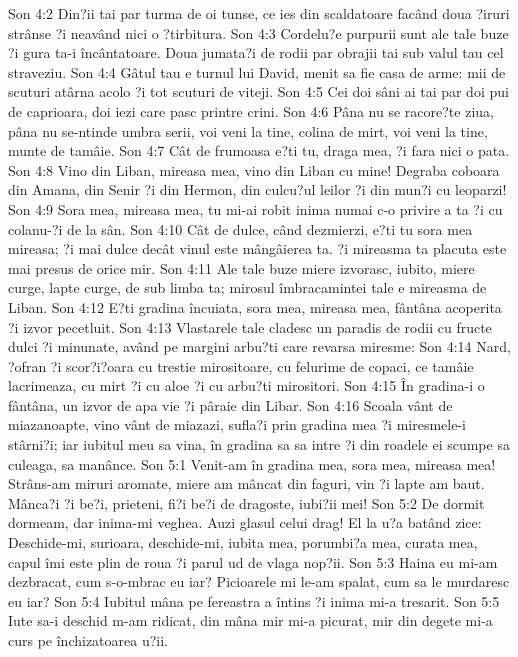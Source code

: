 Son 4:2  Din?ii tai par turma de oi tunse, ce ies din scaldatoare facând doua ?iruri strânse ?i neavând nici o ?tirbitura.
Son 4:3  Cordelu?e purpurii sunt ale tale buze ?i gura ta-i încântatoare. Doua jumata?i de rodii par obrajii tai sub valul tau cel straveziu.
Son 4:4  Gâtul tau e turnul lui David, menit sa fie casa de arme: mii de scuturi atârna acolo ?i tot scuturi de viteji.
Son 4:5  Cei doi sâni ai tai par doi pui de caprioara, doi iezi care pasc printre crini.
Son 4:6  Pâna nu se racore?te ziua, pâna nu se-ntinde umbra serii, voi veni la tine, colina de mirt, voi veni la tine, munte de tamâie.
Son 4:7  Cât de frumoasa e?ti tu, draga mea, ?i fara nici o pata.
Son 4:8  Vino din Liban, mireasa mea, vino din Liban cu mine! Degraba coboara din Amana, din Senir ?i din Hermon, din culcu?ul leilor ?i din mun?i cu leoparzi!
Son 4:9  Sora mea, mireasa mea, tu mi-ai robit inima numai c-o privire a ta ?i cu colanu-?i de la sân.
Son 4:10  Cât de dulce, când dezmierzi, e?ti tu sora mea mireasa; ?i mai dulce decât vinul este mângâierea ta. ?i mireasma ta placuta este mai presus de orice mir.
Son 4:11  Ale tale buze miere izvorasc, iubito, miere curge, lapte curge, de sub limba ta; mirosul îmbracamintei tale e mireasma de Liban.
Son 4:12  E?ti gradina încuiata, sora mea, mireasa mea, fântâna acoperita ?i izvor pecetluit.
Son 4:13  Vlastarele tale cladesc un paradis de rodii cu fructe dulci ?i minunate, având pe margini arbu?ti care revarsa miresme:
Son 4:14  Nard, ?ofran ?i scor?i?oara cu trestie mirositoare, cu felurime de copaci, ce tamâie lacrimeaza, cu mirt ?i cu aloe ?i cu arbu?ti mirositori.
Son 4:15  În gradina-i o fântâna, un izvor de apa vie ?i pâraie din Libar.
Son 4:16  Scoala vânt de miazanoapte, vino vânt de miazazi, sufla?i prin gradina mea ?i miresmele-i stârni?i; iar iubitul meu sa vina, în gradina sa sa intre ?i din roadele ei scumpe sa culeaga, sa manânce.
Son 5:1  Venit-am în gradina mea, sora mea, mireasa mea! Strâns-am miruri aromate, miere am mâncat din faguri, vin ?i lapte am baut. Mânca?i ?i be?i, prieteni, fi?i be?i de dragoste, iubi?ii mei!
Son 5:2  De dormit dormeam, dar inima-mi veghea. Auzi glasul celui drag! El la u?a batând zice: Deschide-mi, surioara, deschide-mi, iubita mea, porumbi?a mea, curata mea, capul îmi este plin de roua ?i parul ud de vlaga nop?ii.
Son 5:3  Haina eu mi-am dezbracat, cum s-o-mbrac eu iar? Picioarele mi le-am spalat, cum sa le murdaresc eu iar?
Son 5:4  Iubitul mâna pe fereastra a întins ?i inima mi-a tresarit.
Son 5:5  Iute sa-i deschid m-am ridicat, din mâna mir mi-a picurat, mir din degete mi-a curs pe închizatoarea u?ii.
